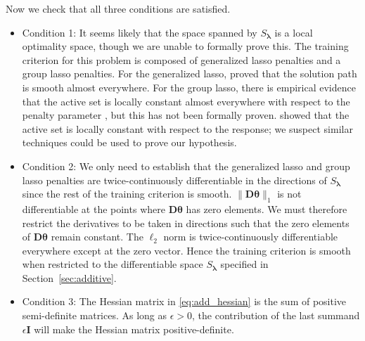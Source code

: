 \documentclass[12pt,letterpaper]{article}
\begin{document}
Now we check that all three conditions are satisfied. 
\begin{itemize}
	\item[] Condition 1: It seems likely that the space spanned by $S_{\boldsymbol{\lambda}}$ is a local optimality space, though we are unable to formally prove this. The training criterion for this problem is composed of generalized lasso penalties and a group lasso penalties. For the generalized lasso, \citet{tibshirani2011solution} proved that the solution path is smooth almost everywhere. For the group lasso, there is empirical evidence that the active set is locally constant almost everywhere with respect to the penalty parameter \citep{yuan2006model}, but this has not been formally proven. \citet{vaiter2012degrees} showed that the active set is locally constant with respect to the response; we suspect similar techniques could be used to prove our hypothesis.
	\item[] Condition 2:  We only need to establish that the generalized lasso and group lasso penalties are twice-continuously differentiable in the directions of $S_{\boldsymbol{\lambda}}$ since the rest of the training criterion is smooth. 
	$\| \boldsymbol{D} \boldsymbol{\theta} \|_1$ is not differentiable at the points where $\boldsymbol{D} \boldsymbol{\theta}$ has zero elements. We must therefore restrict the derivatives to be taken in directions such that the zero elements of $\boldsymbol{D} \boldsymbol{\theta}$ remain constant. The $\ell_2$ norm is twice-continuously differentiable everywhere except at the zero vector. Hence the training criterion is smooth when restricted to the differentiable space $S_{\boldsymbol{\lambda}}$ specified in Section~\ref{sec:additive}.
	\item[] Condition 3: The Hessian matrix in \eqref{eq:add_hessian} is the sum of positive semi-definite matrices. As long as $\epsilon > 0$, the contribution of the last summand $\epsilon \boldsymbol{I}$ will make the Hessian matrix positive-definite.
\end{itemize}
\end{document}
